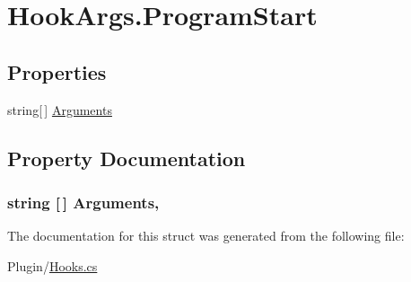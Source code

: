 \hypertarget{structOTA_1_1Plugin_1_1HookArgs_1_1ProgramStart}{}\section{Hook\+Args.\+Program\+Start}
\label{structOTA_1_1Plugin_1_1HookArgs_1_1ProgramStart}
\subsection*{Properties}
\begin{DoxyCompactItemize}
\item 
string\mbox{[}$\,$\mbox{]} \hyperlink{structOTA_1_1Plugin_1_1HookArgs_1_1ProgramStart_a0b011cf99678058c910536e515b7cfe5}{Arguments}
\end{DoxyCompactItemize}


\subsection{Property Documentation}
\hypertarget{structOTA_1_1Plugin_1_1HookArgs_1_1ProgramStart_a0b011cf99678058c910536e515b7cfe5}{}
\subsubsection[{Arguments}]{\setlength{\rightskip}{0pt plus 5cm}string \mbox{[}$\,$\mbox{]} Arguments\hspace{0.3cm}{\ttfamily [get]}, {\ttfamily [set]}}\label{structOTA_1_1Plugin_1_1HookArgs_1_1ProgramStart_a0b011cf99678058c910536e515b7cfe5}


The documentation for this struct was generated from the following file\+:\begin{DoxyCompactItemize}
\item 
Plugin/\hyperlink{Hooks_8cs}{Hooks.\+cs}\end{DoxyCompactItemize}
